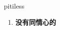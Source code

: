 
\begin{frame}
{\huge pitiless}
\begin{center}
\begin{enumerate}\Large
  \item \textbf{没有同情心的}
\end{enumerate}
\end{center}
\end{frame}

